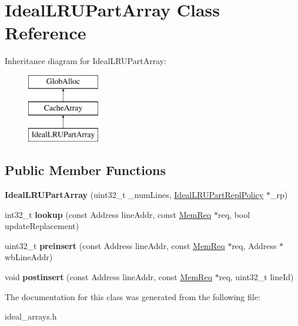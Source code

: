 \hypertarget{classIdealLRUPartArray}{\section{Ideal\-L\-R\-U\-Part\-Array Class Reference}
\label{classIdealLRUPartArray}
}
Inheritance diagram for Ideal\-L\-R\-U\-Part\-Array\-:\begin{figure}[H]
\begin{center}
\leavevmode
\includegraphics[height=3.000000cm]{classIdealLRUPartArray}
\end{center}
\end{figure}
\subsection*{Public Member Functions}
\begin{DoxyCompactItemize}
\item 
\hypertarget{classIdealLRUPartArray_a568cfad2ecdcbb3252d9aea18ebe89d5}{{\bfseries Ideal\-L\-R\-U\-Part\-Array} (uint32\-\_\-t \-\_\-num\-Lines, \hyperlink{classIdealLRUPartReplPolicy}{Ideal\-L\-R\-U\-Part\-Repl\-Policy} $\ast$\-\_\-rp)}\label{classIdealLRUPartArray_a568cfad2ecdcbb3252d9aea18ebe89d5}

\item 
\hypertarget{classIdealLRUPartArray_aa73a82fc679c92237e03bb21ec260ee9}{int32\-\_\-t {\bfseries lookup} (const Address line\-Addr, const \hyperlink{structMemReq}{Mem\-Req} $\ast$req, bool update\-Replacement)}\label{classIdealLRUPartArray_aa73a82fc679c92237e03bb21ec260ee9}

\item 
\hypertarget{classIdealLRUPartArray_a2b01290a2a0f8748057e1fa2a52cbea9}{uint32\-\_\-t {\bfseries preinsert} (const Address line\-Addr, const \hyperlink{structMemReq}{Mem\-Req} $\ast$req, Address $\ast$wb\-Line\-Addr)}\label{classIdealLRUPartArray_a2b01290a2a0f8748057e1fa2a52cbea9}

\item 
\hypertarget{classIdealLRUPartArray_ae3bd83a71bc6234f2c954b54b73c5171}{void {\bfseries postinsert} (const Address line\-Addr, const \hyperlink{structMemReq}{Mem\-Req} $\ast$req, uint32\-\_\-t line\-Id)}\label{classIdealLRUPartArray_ae3bd83a71bc6234f2c954b54b73c5171}

\end{DoxyCompactItemize}


The documentation for this class was generated from the following file\-:\begin{DoxyCompactItemize}
\item 
ideal\-\_\-arrays.\-h\end{DoxyCompactItemize}
